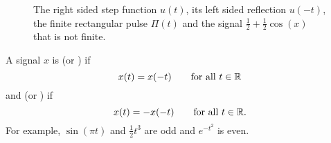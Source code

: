 \begin{figure}[tp]
\caption{The right sided step function $u(t)$, its left sided reflection $u(-t)$, the finite rectangular pulse $\Pi(t)$ and the signal $\tfrac{1}{2} + \tfrac{1}{2}\cos(x)$ that is not finite.  %
} 
\label{fig:stepsided}
\end{figure}

A signal $x$ is  (or ) if
\[
x(t) = x(-t) \qquad  \text{for all $t \in {\mathbb R}$}
\] 
and  (or ) if 
\[
x(t) = -x(-t) \qquad \text{for all $t \in {\mathbb R}$}.
\] 
For example, $\sin(\pi t)$ and $\tfrac{1}{2}t^3$ are odd and $e^{-t^2}$ is even.  %

